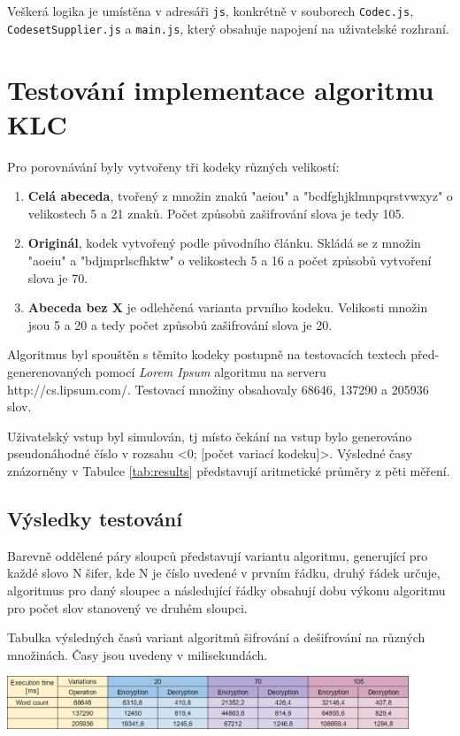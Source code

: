 \documentclass[12pt,a4paper]{article}
\let\oldsection\section
\renewcommand\section{\clearpage\oldsection}
\begin{document}
Veškerá logika je umístěna v adresáři \texttt{js}, konkrétně v souborech \texttt{Codec.js}, \texttt{CodesetSupplier.js} a \texttt{main.js}, který obsahuje napojení na uživatelské rozhraní.

\section{Testování implementace algoritmu KLC}
Pro porovnávání byly vytvořeny tři kodeky různých velikostí:
\begin{enumerate}
\setlength\itemsep{0.0em}
\item \textbf{Celá abeceda}, tvořený z množin znaků "aeiou" a "bcdfghjklmnpqrstvwxyz" o velikostech 5 a 21 znaků. Počet způsobů zašifrování slova je tedy 105.
\item \textbf{Originál}, kodek vytvořený podle původního článku. Skládá se z množin "aoeiu" a "bdjmprlscfhktw" o velikostech 5 a 16 a počet způsobů vytvoření slova je 70.
\item \textbf{Abeceda bez X} je odlehčená varianta prvního kodeku. Velikosti množin jsou 5 a 20 a tedy počet způsobů zašifrování slova je 20.
\end{enumerate}

Algoritmus byl spouštěn s těmito kodeky postupně na testovacích textech před-generenovaných pomocí \textit{Lorem Ipsum} algoritmu na serveru http://cs.lipsum.com/. Testovací množiny obsahovaly 68646, 137290 a 205936 slov.

Uživatelský vstup byl simulován, tj místo čekání na vstup bylo generováno pseudonáhodné číslo v rozsahu <0; [počet variací kodeku]>.
Výsledné časy znázorněny v Tabulce \ref{tab:results} představují aritmetické průměry z pěti měření.

\subsection{Výsledky testování}

Barevně oddělené páry sloupců představují variantu algoritmu, generující pro každé slovo N šifer, kde N je číslo uvedené v prvním řádku, druhý řádek určuje, algoritmus pro daný sloupec a následující řádky obsahují dobu výkonu algoritmu pro počet slov stanovený ve druhém sloupci.

\begin{table}[h]
\center
\caption{Tabulka výsledných časů variant algoritmů šifrování a dešifrování na různých množinách. Časy jsou uvedeny v milisekundách.}
\includegraphics[width=0.9\textwidth]{img/results.png}
\label{tab:results}
\end{table}
\end{document}
